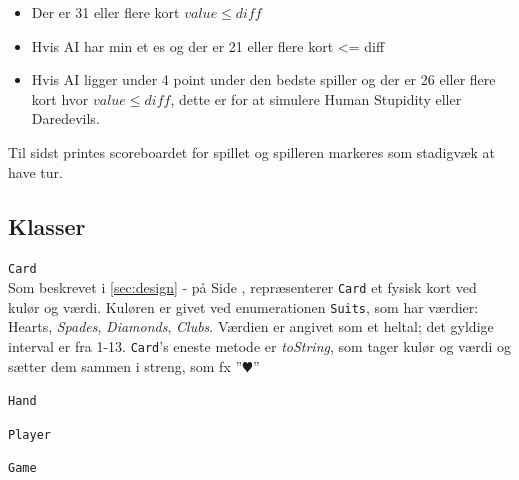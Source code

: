 \documentclass[a4paper]{article}
\newcommand{\namedref}[1]{\autoref{#1} - \nameref{#1} på Side \pageref{#1}}
\begin{document}
\begin{description}
          \begin{itemize}
            \item Der er 31 eller flere kort $value \leq diff$
            \item Hvis AI har min et es og der er 21 eller flere kort <= diff
            \item Hvis AI ligger under 4 point under den bedste spiller og der er 26 eller flere kort hvor $value \leq diff$,
            dette er for at simulere Human Stupidity eller Daredevils.
          \end{itemize}

          Til sidst printes scoreboardet for spillet og spilleren markeres som stadigvæk at have tur.
      \end{description}
      
    \subsection{Klasser} \label{ssec:classes}
      \begin{description}
        \item{\texttt{\texttt{Card}}}~\\
          Som beskrevet i \namedref{sec:design}, repræsenterer \texttt{Card} et fysisk kort ved 
          kulør og værdi. Kuløren er givet ved enumerationen \texttt{Suits}, som har værdier: 
          Hearts, \textit{Spades}, \textit{Diamonds}, \textit{Clubs}. Værdien er angivet som 
          et heltal; det gyldige interval er fra 1-13.
          \texttt{Card}'s eneste metode er \textit{toString}, som tager kulør og værdi og sætter 
          dem sammen i streng, som fx ”$\varheartsuit$”
          
        \item{\texttt{\texttt{Hand}}}~\\
        \item{\texttt{\texttt{Player}}}~\\
        \item{\texttt{Game}}~\\
      \end{description}
    
\end{document}
